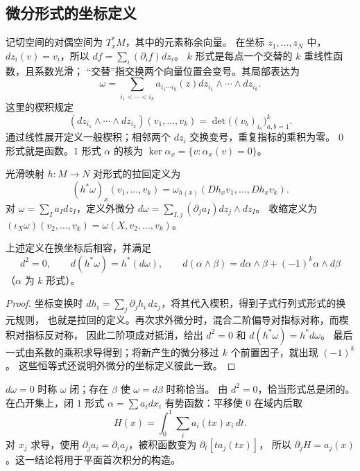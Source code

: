 \subsection*{微分形式的坐标定义}
\begin{definition}[余向量与微分形式]\label{def:forms-coordinate}
记切空间的对偶空间为 $T_x^*M$，其中的元素称余向量。
在坐标 $z_1,\ldots,z_N$ 中，$dz_i(v)=v_i$，所以 $df=\sum_i(\partial_i f)dz_i$。
$k$ 形式是每点一个交替的 $k$ 重线性函数，且系数光滑；
“交替”指交换两个向量位置会变号。其局部表达为
\[
 \omega=\sum_{i_1<\cdots<i_k}a_{i_1\cdots i_k}(z)
 dz_{i_1}\wedge\cdots\wedge dz_{i_k}.
\]
这里的楔积规定
\[
 (dz_{i_1}\wedge\cdots\wedge dz_{i_k})(v_1,\ldots,v_k)
 =\det\bigl((v_b)_{i_a}\bigr)_{a,b=1}^k.
\]
通过线性展开定义一般楔积；相邻两个 $dz_i$ 交换变号，重复指标的乘积为零。
$0$ 形式就是函数。$1$ 形式 $\alpha$ 的核为
$\ker\alpha_x=\{v:\alpha_x(v)=0\}$。
\end{definition}
\begin{definition}[拉回、外微分与收缩]\label{def:exterior-pullback}
光滑映射 $h:M\to N$ 对形式的拉回定义为
\[
 (h^*\omega)_x(v_1,\ldots,v_k)
 =\omega_{h(x)}(Dh_xv_1,\ldots,Dh_xv_k).
\]
对 $\omega=\sum_Ia_I dz_I$，定义外微分
$d\omega=\sum_{I,j}(\partial_j a_I)dz_j\wedge dz_I$。
收缩定义为 $(\iota_X\omega)(v_2,\ldots,v_k)=\omega(X,v_2,\ldots,v_k)$。
\end{definition}
\begin{proposition}
上述定义在换坐标后相容，并满足
\[
 d^2=0,\qquad d(h^*\omega)=h^*(d\omega),\qquad
 d(\alpha\wedge\beta)=d\alpha\wedge\beta+(-1)^k\alpha\wedge d\beta
\]
（$\alpha$ 为 $k$ 形式）。
\end{proposition}
\begin{proof}
坐标变换时 $dh_i=\sum_j\partial_jh_i\,dz_j$，将其代入楔积，得到子式行列式形式的换元规则，
也就是拉回的定义。再次求外微分时，混合二阶偏导对指标对称，而楔积对指标反对称，
因此二阶项成对抵消，给出 $d^2=0$ 和 $d(h^*\omega)=h^*d\omega$。
最后一式由系数的乘积求导得到；将新产生的微分移过 $k$ 个前置因子，就出现 $(-1)^k$。
这些恒等式还说明外微分的坐标定义彼此一致。
\end{proof}
\begin{definition}[闭形式与恰当形式]\label{def:closed-exact-form}
$d\omega=0$ 时称 $\omega$ 闭；存在 $\beta$ 使 $\omega=d\beta$ 时称恰当。
由 $d^2=0$，恰当形式总是闭的。
在凸开集上，闭 $1$ 形式 $\alpha=\sum a_i dx_i$ 有势函数：平移使 $0$ 在域内后取
\[
 H(x)=\int_0^1\sum_i a_i(tx)x_i\,dt.
\]
对 $x_j$ 求导，使用 $\partial_ja_i=\partial_i a_j$，被积函数变为 $\partial_t[ta_j(tx)]$，
所以 $\partial_jH=a_j(x)$。这一结论将用于平面首次积分的构造。
\end{definition}

